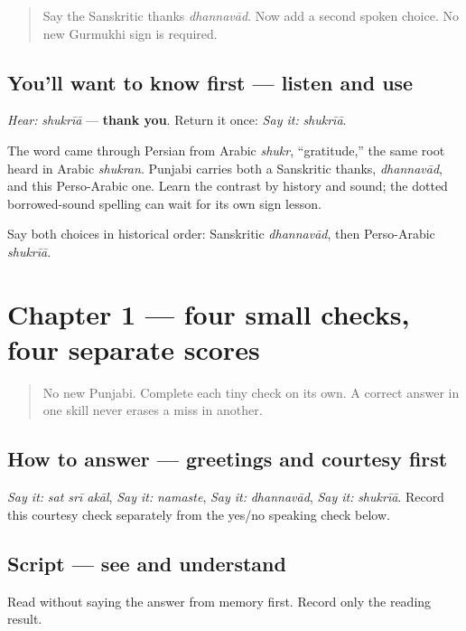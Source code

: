 \label{lesson:PA-C01-shukriya}



\begin{quote}
Say the Sanskritic thanks \emph{dhannavād}. Now add a second spoken choice. No new Gurmukhi sign is required.
\end{quote}

\subsection*{You'll want to know first — listen and use}
\emph{Hear:} \emph{shukrīā} — \textbf{thank you}. Return it once: \emph{Say it:} \emph{shukrīā}.

The word came through Persian from Arabic \emph{shukr}, “gratitude,” the same root heard in Arabic \emph{shukran}. Punjabi carries both a Sanskritic thanks, \emph{dhannavād}, and this Perso-Arabic one. Learn the contrast by history and sound; the dotted borrowed-sound spelling can wait for its own sign lesson.

\begin{tcolorbox}[breakable,colback=teal!4,colframe=teal!35!black,title={Before you move on}]
Say both choices in historical order: Sanskritic \emph{dhannavād}, then Perso-Arabic \emph{shukrīā}.
\end{tcolorbox}
\section[Practice]{Chapter 1 — four small checks, four separate scores}

\label{lesson:PA-C01-practice}



\begin{quote}
No new Punjabi. Complete each tiny check on its own. A correct answer in one skill never erases a miss in another.
\end{quote}

\subsection*{How to answer — greetings and courtesy first}
\emph{Say it:} \emph{sat srī akāl}, \emph{Say it:} \emph{namaste}, \emph{Say it:} \emph{dhannavād}, \emph{Say it:} \emph{shukrīā}. Record this courtesy check separately from the yes/no speaking check below.

\subsection*{Script — see and understand}
Read \textbf{} without saying the answer from memory first. Record only the reading result.

